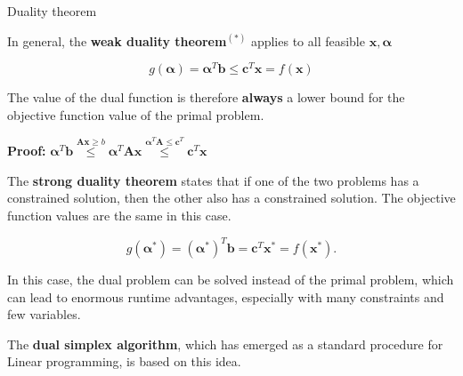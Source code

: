 \begin{vbframe}{Duality theorem}

In general, the \textbf{weak duality theorem}$^{(*)}$ applies to all feasible $\bm{x}, \bm{\alpha}$

$$
g(\bm{\alpha}) = \bm{\alpha}^T\bm{b} \le \bm{c}^T\bm{x}  = f(\bm{x})
$$

The value of the dual function is therefore \textbf{always} a lower bound for the objective function value of the primal problem.

\lz

\textbf{Proof:}
$\bm{\alpha}^T\bm{b} \overset{\bm{Ax} \ge b}{\le}\bm{\alpha}^T\bm{Ax} \overset{\bm{\alpha}^T\bm{A} \le \bm{c}^T}{\le}\bm{c}^T\bm{x}$

\framebreak

The \textbf{strong duality theorem} states that if one of the two problems has a constrained solution, then the other also has a constrained solution. The objective function values are the same in this case.

$$
g(\bm{\alpha}^*) = (\bm{\alpha}^*)^T\bm{b} = \bm{c}^T\bm{x}^* = f(\bm{x}^*).
$$

In this case, the dual problem can be solved instead of the primal problem, which can lead to enormous runtime advantages, especially with many constraints and few variables.

\lz

The \textbf{dual simplex algorithm}, which has emerged as a standard procedure for Linear programming, is based on this idea.


\end{vbframe}

\endlecture



